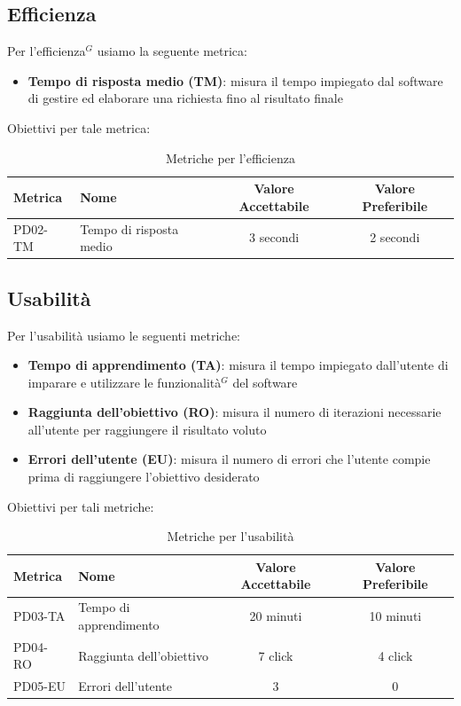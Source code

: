 \documentclass[a4paper,10pt]{article}
\begin{document}
\subsection{Efficienza}
Per l'efficienza$^G$ usiamo la seguente metrica:
\begin{itemize}
    \item \textbf{Tempo di risposta medio (TM)}: misura il tempo impiegato dal software di gestire ed elaborare una richiesta fino al risultato finale
\end{itemize}
Obiettivi per tale metrica:
\begin{table}[H]
\centering
\renewcommand{\arraystretch}{1.2}
\begin{tabular}{|l|l|c|c|}
\hline
\textbf{Metrica} & \textbf{Nome} & \textbf{Valore Accettabile} & \textbf{Valore Preferibile} \\
\hline
PD02-TM & Tempo di risposta medio & 3 secondi & 2 secondi \\
\hline
\end{tabular}
\caption{Metriche per l'efficienza}
\label{tab:metriche-efficienza}
\end{table}
\subsection{Usabilità}
Per l'usabilità usiamo le seguenti metriche:
\begin{itemize}
    \item \textbf{Tempo di apprendimento (TA)}: misura il tempo impiegato dall'utente di imparare e utilizzare le funzionalità$^G$ del software 
    \item \textbf{Raggiunta dell'obiettivo (RO)}: misura il numero di iterazioni necessarie all'utente per raggiungere il risultato voluto
    \item \textbf{Errori dell'utente (EU)}: misura il numero di errori che l'utente compie prima di raggiungere l'obiettivo desiderato 
\end{itemize}
Obiettivi per tali metriche:
\begin{table}[H]
\centering
\renewcommand{\arraystretch}{1.2}
\begin{tabular}{|l|l|c|c|}
\hline
\textbf{Metrica} & \textbf{Nome} & \textbf{Valore Accettabile} & \textbf{Valore Preferibile} \\
\hline
PD03-TA & Tempo di apprendimento & 20 minuti & 10 minuti \\
PD04-RO & Raggiunta dell'obiettivo & 7 click & 4 click \\
PD05-EU & Errori dell'utente & 3 & 0 \\
\hline
\end{tabular}
\caption{Metriche per l'usabilità}
\label{tab:metriche-usabilità}
\end{table}
\end{document}
